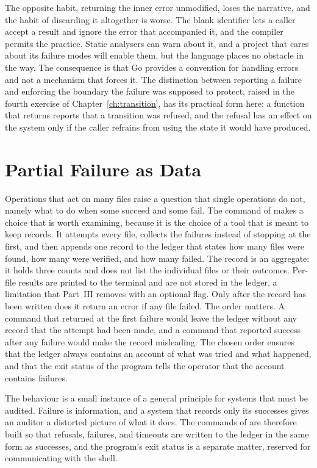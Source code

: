 The opposite habit, returning the inner error unmodified, loses the narrative, and the habit of discarding it altogether is worse. The blank identifier \gocode{\_} lets a caller accept a result and ignore the error that accompanied it, and the compiler permits the practice. Static analysers can warn about it, and a project that cares about its failure modes will enable them, but the language places no obstacle in the way. The consequence is that Go provides a convention for handling errors and not a mechanism that forces it. The distinction between reporting a failure and enforcing the boundary the failure was supposed to protect, raised in the fourth exercise of Chapter~\ref{ch:transition}, has its practical form here: a function that returns  reports that a transition was refused, and the refusal has an effect on the system only if the caller refrains from using the state it would have produced.

\section{Partial Failure as Data}

Operations that act on many files raise a question that single operations do not, namely what to do when some succeed and some fail. The  command of \golab{} makes a choice that is worth examining, because it is the choice of a tool that is meant to keep records. It attempts every file, collects the failures instead of stopping at the first, and then appends one record to the ledger that states how many files were found, how many were verified, and how many failed. The record is an aggregate: it holds three counts and does not list the individual files or their outcomes. Per-file results are printed to the terminal and are not stored in the ledger, a limitation that Part~III removes with an optional flag. Only after the record has been written does it return an error if any file failed. The order matters. A command that returned at the first failure would leave the ledger without any record that the attempt had been made, and a command that reported success after any failure would make the record misleading. The chosen order ensures that the ledger always contains an account of what was tried and what happened, and that the exit status of the program tells the operator that the account contains failures.

The behaviour is a small instance of a general principle for systems that must be audited. Failure is information, and a system that records only its successes gives an auditor a distorted picture of what it does. The commands of \golab{} are therefore built so that refusals, failures, and timeouts are written to the ledger in the same form as successes, and the program's exit status is a separate matter, reserved for communicating with the shell.

